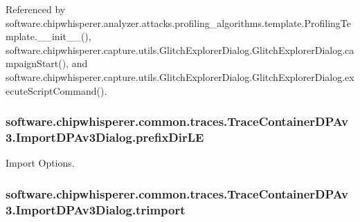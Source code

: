 Referenced by software.\+chipwhisperer.\+analyzer.\+attacks.\+profiling\+\_\+algorithms.\+template.\+Profiling\+Template.\+\_\+\+\_\+init\+\_\+\+\_\+(), software.\+chipwhisperer.\+capture.\+utils.\+Glitch\+Explorer\+Dialog.\+Glitch\+Explorer\+Dialog.\+campaign\+Start(), and software.\+chipwhisperer.\+capture.\+utils.\+Glitch\+Explorer\+Dialog.\+Glitch\+Explorer\+Dialog.\+execute\+Script\+Command().

\hypertarget{classsoftware_1_1chipwhisperer_1_1common_1_1traces_1_1TraceContainerDPAv3_1_1ImportDPAv3Dialog_a2e51a145f598b93a272f81c1ceedd847}{}
\subsubsection[{prefix\+Dir\+L\+E}]{\setlength{\rightskip}{0pt plus 5cm}software.\+chipwhisperer.\+common.\+traces.\+Trace\+Container\+D\+P\+Av3.\+Import\+D\+P\+Av3\+Dialog.\+prefix\+Dir\+L\+E}\label{classsoftware_1_1chipwhisperer_1_1common_1_1traces_1_1TraceContainerDPAv3_1_1ImportDPAv3Dialog_a2e51a145f598b93a272f81c1ceedd847}


Import Options. 

\hypertarget{classsoftware_1_1chipwhisperer_1_1common_1_1traces_1_1TraceContainerDPAv3_1_1ImportDPAv3Dialog_a6c11dadab6221c31994f6c850fc49a4a}{}
\subsubsection[{trimport}]{\setlength{\rightskip}{0pt plus 5cm}software.\+chipwhisperer.\+common.\+traces.\+Trace\+Container\+D\+P\+Av3.\+Import\+D\+P\+Av3\+Dialog.\+trimport}\label{classsoftware_1_1chipwhisperer_1_1common_1_1traces_1_1TraceContainerDPAv3_1_1ImportDPAv3Dialog_a6c11dadab6221c31994f6c850fc49a4a}


